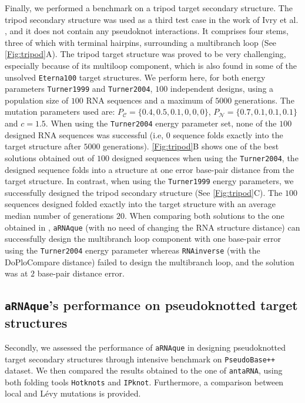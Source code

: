 Finally, we performed a benchmark on a tripod target secondary structure. The tripod secondary structure was used as a third test case in the work of Ivry et al. \cite{ivry2009image}, and it does not contain any pseudoknot interactions. It comprises four stems, three of which with terminal hairpins, surrounding a multibranch loop (See \autoref{Fig:tripod}A). The tripod target structure was proved to be very challenging, especially because of its multiloop component, which is also found in some of the unsolved \texttt{Eterna100} target structures. We perform here, for both energy parameters \texttt{Turner1999} and  \texttt{Turner2004}, $100$ independent designs, using a population size of $100$ \ac{RNA} sequences and a maximum of $5000$ generations. The mutation parameters used are: $P_{\mathcal{C}}=\{0.4,0.5,0.1,0,0,0\}$, $P_{\mathcal{N}}=\{0.7,0.1,0.1,0.1\}$ and $c=1.5$. When using the \texttt{Turner2004} energy parameter set, none of the $100$ designed \ac{RNA} sequences was successful (i.e, $0$ sequence folds exactly into the target structure after $5000$ generations). \autoref{Fig:tripod}B shows one of the best solutions obtained out of $100$ designed sequences when using the \texttt{Turner2004}, the designed sequence folds into a structure at one error base-pair distance from the target structure. In contrast, when using the \texttt{Turner1999} energy parameters, we successfully designed the tripod secondary structure (See \autoref{Fig:tripod}C). The $100$ sequences designed folded exactly into the target structure with an average median number of generations $20$. When comparing both solutions to the one obtained in \cite{ivry2009image}, \texttt{aRNAque} (with no need of changing the \ac{RNA} structure distance) can successfully design the multibranch loop component with one base-pair error using the \texttt{Turner2004} energy parameter whereas \texttt{RNAinverse} (with the DoPloCompare distance) failed to design the multibranch loop, and the solution was at $2$ base-pair distance error.

\subsection{\texttt{aRNAque}'s performance on pseudoknotted target structures }
Secondly, we assessed the performance of \texttt{aRNAque} in designing pseudoknotted target secondary structures through intensive benchmark on \texttt{PseudoBase++} dataset. We then compared the results obtained to the one of \texttt{antaRNA}, using both folding tools \texttt{Hotknots} and \texttt{IPknot}. Furthermore, a comparison between local and Lévy mutations is provided.
